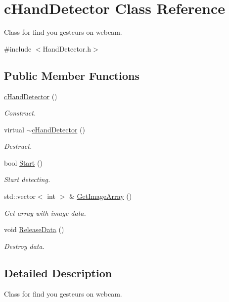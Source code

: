 \hypertarget{classcHandDetector}{
\section{cHandDetector Class Reference}
\label{classcHandDetector}
}


Class for find you gesteurs on webcam.  




{\ttfamily \#include $<$HandDetector.h$>$}

\subsection*{Public Member Functions}
\begin{DoxyCompactItemize}
\item 
\hyperlink{classcHandDetector_ad40baa578448077b89cf5a2d44401c11}{cHandDetector} ()
\begin{DoxyCompactList}\small\item\em Construct. \end{DoxyCompactList}\item 
virtual \hyperlink{classcHandDetector_a27c48453e257b2e73ec0557484568a38}{$\sim$cHandDetector} ()
\begin{DoxyCompactList}\small\item\em Destruct. \end{DoxyCompactList}\item 
bool \hyperlink{classcHandDetector_a56bd5b66bff33fe375e6a4e97b394481}{Start} ()
\begin{DoxyCompactList}\small\item\em Start detecting. \end{DoxyCompactList}\item 
std::vector$<$ int $>$ \& \hyperlink{classcHandDetector_a10bca4c52203b33a453f4a7017d03d65}{GetImageArray} ()
\begin{DoxyCompactList}\small\item\em Get array with image data. \end{DoxyCompactList}\item 
void \hyperlink{classcHandDetector_acadedbb4524af49f115cc133a47ba69d}{ReleaseData} ()
\begin{DoxyCompactList}\small\item\em Destroy data. \end{DoxyCompactList}\end{DoxyCompactItemize}


\subsection{Detailed Description}
Class for find you gesteurs on webcam. 

